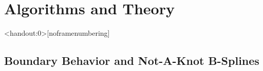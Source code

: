 \section{Algorithms and Theory}



\begin{frame}<handout:0>[noframenumbering]
  \begin{overlay}
    \sectionCircle
  \end{overlay}
\end{frame}



\subsection{Boundary Behavior and Not-A-Knot B-Splines}

